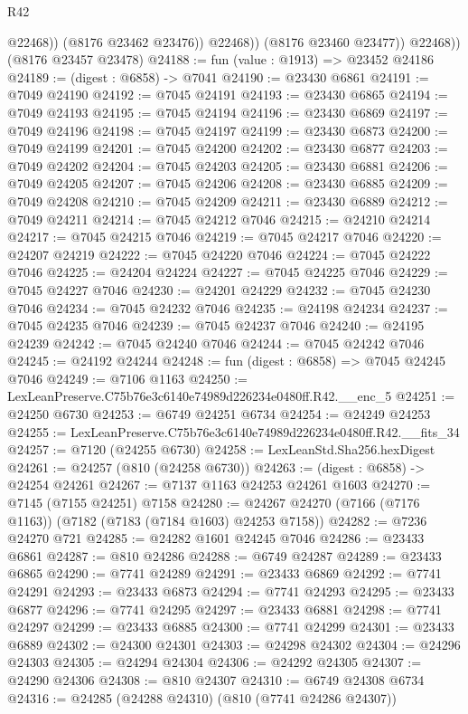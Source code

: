 \begin{lexlean}{R42}
\begin{coremodule}
{                    @22468))
                (@8176 @23462 @23476))
              @22468))
          (@8176 @23460 @23477))
        @22468))
    (@8176 @23457 @23478)
@24188 := fun (value : @1913) => @23452 @24186
@24189 := (digest : @6858) -> @7041
@24190 := @23430 @6861
@24191 := @7049 @24190
@24192 := @7045 @24191
@24193 := @23430 @6865
@24194 := @7049 @24193
@24195 := @7045 @24194
@24196 := @23430 @6869
@24197 := @7049 @24196
@24198 := @7045 @24197
@24199 := @23430 @6873
@24200 := @7049 @24199
@24201 := @7045 @24200
@24202 := @23430 @6877
@24203 := @7049 @24202
@24204 := @7045 @24203
@24205 := @23430 @6881
@24206 := @7049 @24205
@24207 := @7045 @24206
@24208 := @23430 @6885
@24209 := @7049 @24208
@24210 := @7045 @24209
@24211 := @23430 @6889
@24212 := @7049 @24211
@24214 := @7045 @24212 @7046
@24215 := @24210 @24214
@24217 := @7045 @24215 @7046
@24219 := @7045 @24217 @7046
@24220 := @24207 @24219
@24222 := @7045 @24220 @7046
@24224 := @7045 @24222 @7046
@24225 := @24204 @24224
@24227 := @7045 @24225 @7046
@24229 := @7045 @24227 @7046
@24230 := @24201 @24229
@24232 := @7045 @24230 @7046
@24234 := @7045 @24232 @7046
@24235 := @24198 @24234
@24237 := @7045 @24235 @7046
@24239 := @7045 @24237 @7046
@24240 := @24195 @24239
@24242 := @7045 @24240 @7046
@24244 := @7045 @24242 @7046
@24245 := @24192 @24244
@24248 := fun (digest : @6858) => @7045 @24245 @7046
@24249 := @7106 @1163
@24250 := LexLeanPreserve.C75b76e3c6140e74989d226234e0480ff.R42.__enc_5
@24251 := @24250 @6730
@24253 := @6749 @24251 @6734
@24254 := @24249 @24253
@24255 := LexLeanPreserve.C75b76e3c6140e74989d226234e0480ff.R42.__fits_34
@24257 := @7120 (@24255 @6730)
@24258 := LexLeanStd.Sha256.hexDigest
@24261 := @24257 (@810 (@24258 @6730))
@24263 := (digest : @6858) -> @24254 @24261
@24267 := @7137 @1163 @24253 @24261 @1603
@24270 := @7145 (@7155 @24251) @7158
@24280 := @24267 @24270 (@7166 (@7176 @1163)) (@7182 (@7183 (@7184 @1603) @24253 @7158))
@24282 := @7236 @24270 @721
@24285 := @24282 @1601 @24245 @7046
@24286 := @23433 @6861
@24287 := @810 @24286
@24288 := @6749 @24287
@24289 := @23433 @6865
@24290 := @7741 @24289
@24291 := @23433 @6869
@24292 := @7741 @24291
@24293 := @23433 @6873
@24294 := @7741 @24293
@24295 := @23433 @6877
@24296 := @7741 @24295
@24297 := @23433 @6881
@24298 := @7741 @24297
@24299 := @23433 @6885
@24300 := @7741 @24299
@24301 := @23433 @6889
@24302 := @24300 @24301
@24303 := @24298 @24302
@24304 := @24296 @24303
@24305 := @24294 @24304
@24306 := @24292 @24305
@24307 := @24290 @24306
@24308 := @810 @24307
@24310 := @6749 @24308 @6734
@24316 := @24285 (@24288 @24310) (@810 (@7741 @24286 @24307))
}
\end{coremodule}
\end{lexlean}
